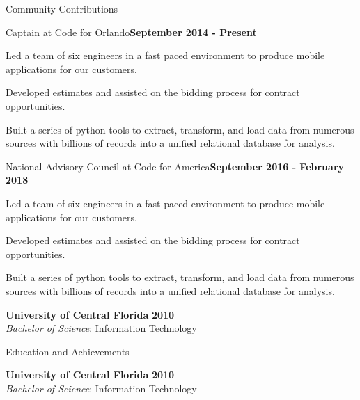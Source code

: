 \documentclass{resume} %
\begin{document}
\begin{rSection}{Community Contributions}

\begin{rSubsection}{Captain at Code for Orlando}{\bf September 2014 - Present}{}{}

\item Led a team of six engineers in a fast paced environment to produce mobile applications for our customers.
\item Developed estimates and assisted on the bidding process for contract opportunities.
\item Built a series of python tools to extract, transform, and load data from numerous sources with billions of records into a unified relational database for analysis.


\end{rSubsection}

\begin{rSubsection}{National Advisory Council at Code for America}{\bf September 2016 - February 2018}{}{}

\item Led a team of six engineers in a fast paced environment to produce mobile applications for our customers.
\item Developed estimates and assisted on the bidding process for contract opportunities.
\item Built a series of python tools to extract, transform, and load data from numerous sources with billions of records into a unified relational database for analysis.


\end{rSubsection}

{\bf University of Central Florida} \hfill {\bf 2010} \\ 
{\it Bachelor of Science}: Information Technology \\
\end{rSection}


\begin{rSection}{Education and Achievements}

{\bf University of Central Florida} \hfill {\bf 2010} \\ 
{\it Bachelor of Science}: Information Technology \\
\end{rSection}
\end{document}
